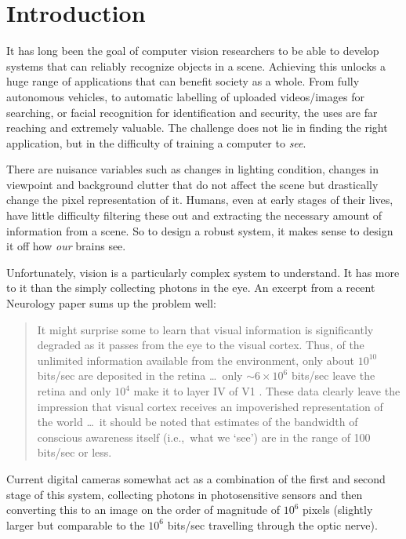 \chapter{Introduction}\label{ch:intro}

\def \path {intro}
\def \imgpath {\path/images}

It has long been the goal of computer vision researchers to be able to develop
systems that can reliably recognize objects in a scene. Achieving this unlocks a huge
range of applications that can benefit society as a whole. From fully
autonomous vehicles, to automatic labelling of uploaded videos/images for searching,
or facial recognition for identification and security, the uses are far
reaching and extremely valuable. The challenge does not lie in finding the
right application, but in the difficulty of training a computer to \emph{see}.

There are nuisance variables such as changes in
lighting condition, changes in viewpoint and background clutter that do not
affect the scene but drastically change the pixel representation of it. 
Humans, even at early stages of their lives, have little difficulty filtering
these out and extracting the necessary amount of information from a scene. So
to design a robust system, it makes sense to design it off how \emph{our}
brains see. 

Unfortunately, vision is a particularly complex system to understand. It has
more to it than the simply collecting photons in the eye.
An excerpt from a recent Neurology paper \cite{raichle_two_2010} sums up the problem
well:

\begin{quotation}
It might surprise some to learn that visual information is significantly
degraded as it passes from the eye to the visual cortex. Thus, of the unlimited
information available from the environment, only about $10^{10}$ bits/sec are
deposited in the retina \ldots\ only $\sim 6\times 10^6$
bits/sec leave the retina and only $10^4$ make it to layer IV of V1
\cite{anderson_directed_2005,tor_norretranders_user_1998}. These data
clearly leave the impression that visual cortex receives an impoverished
representation of the world \ldots\ it should be noted that estimates of the
bandwidth of conscious awareness itself (i.e.,\ what we `see') are in the range
of 100 bits/sec or less\cite{anderson_directed_2005,
tor_norretranders_user_1998}.
\end{quotation}

Current digital cameras somewhat act as a combination of the first and second
stage of this system, collecting photons in photosensitive sensors and then
converting this to an image on the order of magnitude of $10^6$ pixels (slightly
larger but comparable to the $10^6$ bits/sec travelling through the optic
nerve).

